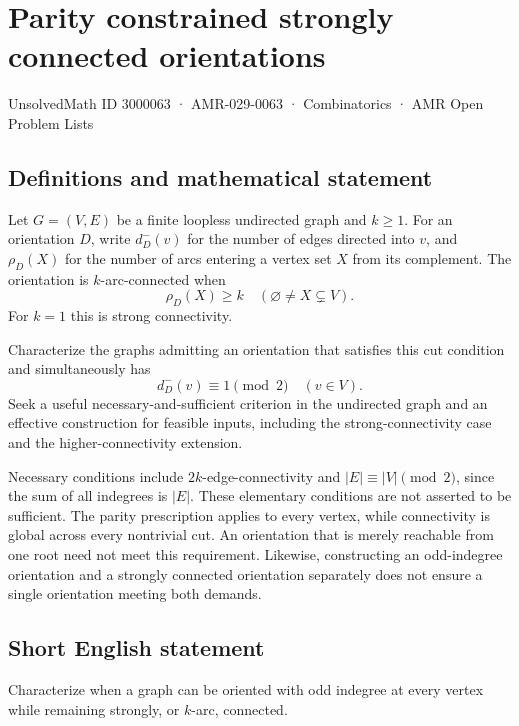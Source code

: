 \documentclass[11pt,a4paper]{article}
\begin{document}
\section*{Parity constrained strongly connected orientations}\label{3000063}
{\small UnsolvedMath ID 3000063 · AMR-029-0063 · Combinatorics · AMR Open Problem Lists}
\subsection{Definitions and mathematical statement}
Let $G=(V,E)$ be a finite loopless undirected graph and $k\ge1$.
For an orientation $D$, write $d_D^-(v)$ for the number of edges
directed into $v$, and $\rho_D(X)$ for the number of arcs entering
a vertex set $X$ from its complement. The orientation is
$k$-arc-connected when
\[
                            \rho_D(X)\ge k
                                  \quad(\varnothing\ne X\subsetneq V).
\]
For $k=1$ this is strong connectivity.

Characterize the graphs admitting an orientation that satisfies this
cut condition and simultaneously has
\[
                           d_D^-(v)\equiv1\pmod2
                                          \quad(v\in V).
\]
Seek a useful necessary-and-sufficient criterion in the undirected
graph and an effective construction for feasible inputs, including
the strong-connectivity case and the higher-connectivity extension.

Necessary conditions include $2k$-edge-connectivity and
$|E|\equiv |V|\pmod2$, since the sum of all indegrees is $|E|$.
These elementary conditions are not asserted to be sufficient.
The parity prescription applies to every vertex, while connectivity
is global across every nontrivial cut. An orientation that is merely
reachable from one root need not meet this requirement. Likewise,
constructing an odd-indegree orientation and a strongly connected
orientation separately does not ensure a single orientation meeting
both demands.
\subsection{Short English statement}
Characterize when a graph can be oriented with odd indegree at
every vertex while remaining strongly, or $k$-arc, connected.
\end{document}
